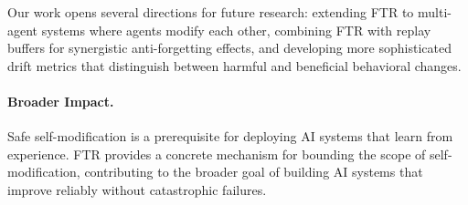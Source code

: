 \documentclass{article}
\begin{document}
Our work opens several directions for future research: extending FTR to multi-agent systems where agents modify each other, combining FTR with replay buffers for synergistic anti-forgetting effects, and developing more sophisticated drift metrics that distinguish between harmful and beneficial behavioral changes.

\paragraph{Broader Impact.}
Safe self-modification is a prerequisite for deploying AI systems that learn from experience. FTR provides a concrete mechanism for bounding the scope of self-modification, contributing to the broader goal of building AI systems that improve reliably without catastrophic failures.
\end{document}
